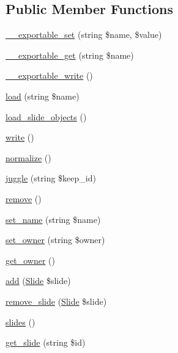 \subsection*{Public Member Functions}
\begin{DoxyCompactItemize}
\item 
\hyperlink{classlibresignage_1_1common_1_1php_1_1queue_1_1Queue_a9386fd722e1601ced3c9c5d997bba9bf}{\+\_\+\+\_\+exportable\+\_\+set} (string \$name, \$value)
\item 
\hyperlink{classlibresignage_1_1common_1_1php_1_1queue_1_1Queue_a0ccc4ced8e0c340b9d6dd144f5846478}{\+\_\+\+\_\+exportable\+\_\+get} (string \$name)
\item 
\hyperlink{classlibresignage_1_1common_1_1php_1_1queue_1_1Queue_a7dcc50eafb3714dbcc80d3bd061cd254}{\+\_\+\+\_\+exportable\+\_\+write} ()
\item 
\hyperlink{classlibresignage_1_1common_1_1php_1_1queue_1_1Queue_ae1b5be576d545c15ed2d172f45975793}{load} (string \$name)
\item 
\hyperlink{classlibresignage_1_1common_1_1php_1_1queue_1_1Queue_a7f3e6f40d82ea9858406105e1a45718b}{load\+\_\+slide\+\_\+objects} ()
\item 
\hyperlink{classlibresignage_1_1common_1_1php_1_1queue_1_1Queue_ac804ad36e203e4c202272b6a9d36ad88}{write} ()
\item 
\hyperlink{classlibresignage_1_1common_1_1php_1_1queue_1_1Queue_a3e1f363824046aa32e8ad9b9c214f43f}{normalize} ()
\item 
\hyperlink{classlibresignage_1_1common_1_1php_1_1queue_1_1Queue_a5b9e3298214db1fc911a599dd092d373}{juggle} (string \$keep\+\_\+id)
\item 
\hyperlink{classlibresignage_1_1common_1_1php_1_1queue_1_1Queue_a25cadc947d5912bf1b1b110308783896}{remove} ()
\item 
\hyperlink{classlibresignage_1_1common_1_1php_1_1queue_1_1Queue_aee70c4f79dcbc8e034d2f22c28d49a34}{set\+\_\+name} (string \$name)
\item 
\hyperlink{classlibresignage_1_1common_1_1php_1_1queue_1_1Queue_a49a04dd658c6b946fc271b5c7b6f0d58}{set\+\_\+owner} (string \$owner)
\item 
\hyperlink{classlibresignage_1_1common_1_1php_1_1queue_1_1Queue_a776564394ff5efaa2915a11d44fc939f}{get\+\_\+owner} ()
\item 
\hyperlink{classlibresignage_1_1common_1_1php_1_1queue_1_1Queue_aa741325a4388d7d24b81b15c72ca204d}{add} (\hyperlink{classlibresignage_1_1common_1_1php_1_1slide_1_1Slide}{Slide} \$slide)
\item 
\hyperlink{classlibresignage_1_1common_1_1php_1_1queue_1_1Queue_a2a8734f0c48a6ce5601b616758c5d2d1}{remove\+\_\+slide} (\hyperlink{classlibresignage_1_1common_1_1php_1_1slide_1_1Slide}{Slide} \$slide)
\item 
\hyperlink{classlibresignage_1_1common_1_1php_1_1queue_1_1Queue_a387e725a61c6e5d69b86906dd8a7ff58}{slides} ()
\item 
\hyperlink{classlibresignage_1_1common_1_1php_1_1queue_1_1Queue_ae09cbc15368b9e5dd7b58b9d29f189e8}{get\+\_\+slide} (string \$id)
\end{DoxyCompactItemize}
